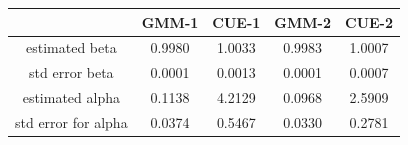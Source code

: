 \begin{table}[ht]
\centering
\begin{tabular}{ccccc}
  \hline
 & GMM-1 & CUE-1 & GMM-2 & CUE-2 \\ 
  \hline
estimated beta & 0.9980 & 1.0033 & 0.9983 & 1.0007 \\ 
  std error beta & 0.0001 & 0.0013 & 0.0001 & 0.0007 \\ 
  estimated alpha & 0.1138 & 4.2129 & 0.0968 & 2.5909 \\ 
  std error for alpha & 0.0374 & 0.5467 & 0.0330 & 0.2781 \\ 
   \hline
\end{tabular}
\end{table}
